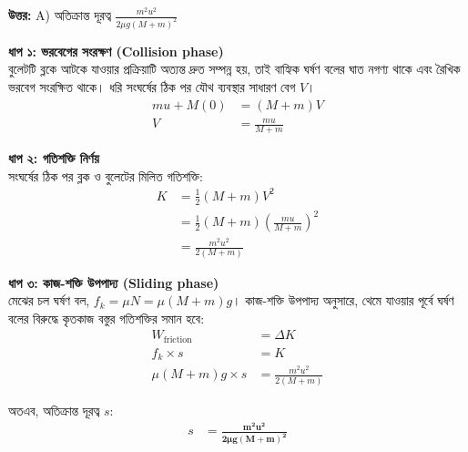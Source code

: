 \documentclass[12pt, a4paper]{article}
\begin{document}
\vspace{0.5em}
\begin{tcolorbox}[answerbox]
    \textbf{\color{success} উত্তর:} A) অতিক্রান্ত দূরত্ব $\frac{m^2 u^2}{2\mu g (M + m)^2}$
\end{tcolorbox}
\vspace{1em}

\begin{tcolorbox}[solutionbox={সমাধান (Solution)}]
    \noindent
    \textbf{ধাপ ১: ভরবেগের সংরক্ষণ (Collision phase)} \\
    বুলেটটি ব্লকে আটকে যাওয়ার প্রক্রিয়াটি অত্যন্ত দ্রুত সম্পন্ন হয়, তাই বাহ্যিক ঘর্ষণ বলের ঘাত নগণ্য থাকে এবং রৈখিক ভরবেগ সংরক্ষিত থাকে। ধরি সংঘর্ষের ঠিক পর যৌথ ব্যবস্থার সাধারণ বেগ $V$।
    \begin{align*}
        m u + M (0) &= (M + m) V \\
        V &= \frac{m u}{M + m}
    \end{align*}
    
    \vspace{0.5em}
    \noindent\textbf{ধাপ ২: গতিশক্তি নির্ণয়} \\
    সংঘর্ষের ঠিক পর ব্লক ও বুলেটের মিলিত গতিশক্তি:
    \begin{align*}
        K &= \frac{1}{2} (M + m) V^2 \\
          &= \frac{1}{2} (M + m) \left(\frac{m u}{M + m}\right)^2 \\
          &= \frac{m^2 u^2}{2 (M + m)}
    \end{align*}
    
    \vspace{0.5em}
    \noindent\textbf{ধাপ ৩: কাজ-শক্তি উপপাদ্য (Sliding phase)} \\
    মেঝের চল ঘর্ষণ বল, $f_k = \mu N = \mu (M + m) g$। 
    কাজ-শক্তি উপপাদ্য অনুসারে, থেমে যাওয়ার পূর্বে ঘর্ষণ বলের বিরুদ্ধে কৃতকাজ বস্তুর গতিশক্তির সমান হবে:
    \begin{align*}
        W_{\text{friction}} &= \Delta K \\
        f_k \times s &= K \\
        \mu (M + m) g \times s &= \frac{m^2 u^2}{2 (M + m)}
    \end{align*}
    
    অতএব, অতিক্রান্ত দূরত্ব $s$:
    \begin{align*}
        s &= \mathbf{\frac{m^2 u^2}{2\mu g (M + m)^2}}
    \end{align*}
\end{tcolorbox}
\end{document}
